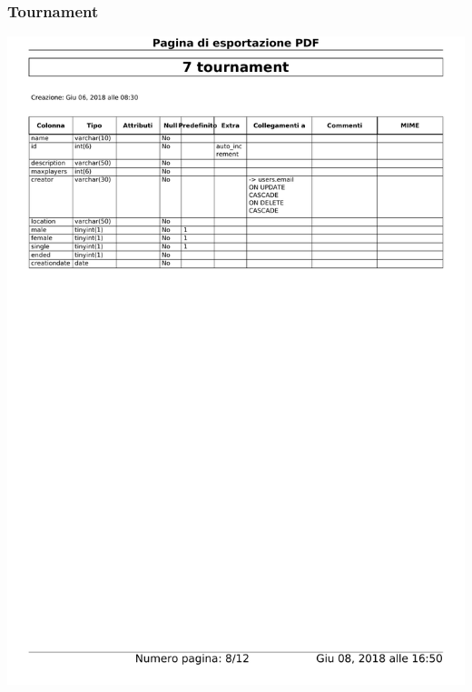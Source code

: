 \documentclass{article}
\begin{document}
    \subsubsection{Tournament}
    \begin{center}
        \includegraphics[width=15cm]{images/tournament}
    \end{center}
\end{document}
